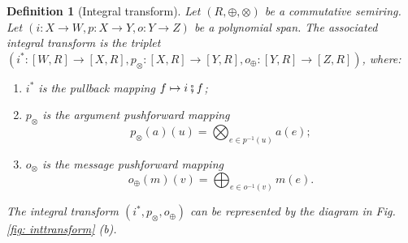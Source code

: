 \documentclass[11pt,a4paper,openright,twoside]{report}
\newcounter{mycounter}
\theoremstyle{plain}
\newtheorem{definition}[mycounter]{Definition}
\theoremstyle{definition}
\begin{document}
\begin{definition}[Integral transform]
  Let $(R, \oplus, \otimes)$ be a commutative semiring. Let $(i: X \to W,p: X \to Y,o: Y \to Z)$ be a polynomial span. The associated integral transform is the triplet $(i^*: [W,R] \to [X,R], p_{\otimes}: [X,R] \to [Y,R], o_{\oplus}: [Y,R] \to [Z,R])$, where:
  \begin{enumerate}
    \item $i^*$ is the pullback mapping $f \mapsto i \fatsemi f$;
    \item $p_{\otimes}$ is the argument pushforward mapping 
    \[p_{\otimes}(a)(u) = \bigotimes_{e \in p^{-1}(u)}a(e);\]
    \item $o_{\otimes}$ is the message pushforward mapping 
    \[o_{\oplus}(m)(v) = \bigoplus_{e \in o^{-1}(v)}m(e).\]
  \end{enumerate}
  The integral transform $(i^*, p_{\otimes}, o_{\oplus})$ can be represented by the diagram in \textit{Fig. \ref{fig: inttransform} (b)}.
\end{definition}
\end{document}
